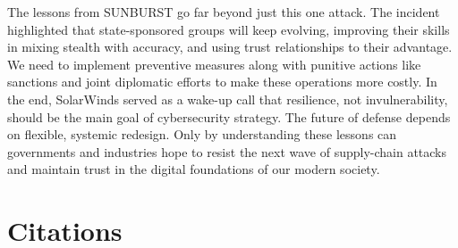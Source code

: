 \documentclass[conference]{IEEEtran}
\begin{document}
The lessons from SUNBURST go far beyond just this one attack. The incident highlighted that state-sponsored groups will keep evolving, 
improving their skills in mixing stealth with accuracy, and using trust relationships to their advantage. We need to implement preventive 
measures along with punitive actions like sanctions and joint diplomatic efforts to make these operations more costly. In the end, SolarWinds 
served as a wake-up call that resilience, not invulnerability, should be the main goal of cybersecurity strategy. The future of defense depends 
on flexible, systemic redesign. Only by understanding these lessons can governments and industries hope to resist the next wave of supply-chain 
attacks and maintain trust in the digital foundations of our modern society.

\section*{Citations}
\end{document}

